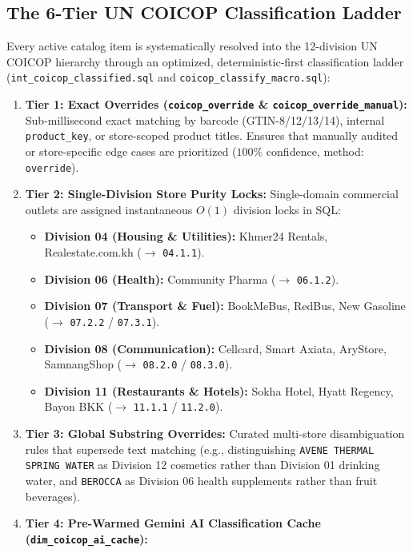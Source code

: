 \documentclass[11pt,a4paper,oneside]{article}
\begin{document}
\subsection{The 6-Tier UN COICOP Classification Ladder}
Every active catalog item is systematically resolved into the 12-division UN COICOP hierarchy through an optimized, deterministic-first classification ladder (\texttt{int\_coicop\_classified.sql} and \texttt{coicop\_classify\_macro.sql}):
\begin{enumerate}
    \item \textbf{Tier 1: Exact Overrides (\texttt{coicop\_override} \& \texttt{coicop\_override\_manual}):}
        Sub-millisecond exact matching by barcode (GTIN-8/12/13/14), internal \texttt{product\_key}, or store-scoped product titles. Ensures that manually audited or store-specific edge cases are prioritized ($100\%$ confidence, method: \texttt{override}).
    \item \textbf{Tier 2: Single-Division Store Purity Locks:}
        Single-domain commercial outlets are assigned instantaneous $O(1)$ division locks in SQL:
        \begin{itemize}[noitemsep]
            \item \textbf{Division 04 (Housing \& Utilities):} Khmer24 Rentals, Realestate.com.kh ($\rightarrow$ \texttt{04.1.1}).
            \item \textbf{Division 06 (Health):} Community Pharma ($\rightarrow$ \texttt{06.1.2}).
            \item \textbf{Division 07 (Transport \& Fuel):} BookMeBus, RedBus, New Gasoline ($\rightarrow$ \texttt{07.2.2} / \texttt{07.3.1}).
            \item \textbf{Division 08 (Communication):} Cellcard, Smart Axiata, AryStore, SamnangShop ($\rightarrow$ \texttt{08.2.0} / \texttt{08.3.0}).
            \item \textbf{Division 11 (Restaurants \& Hotels):} Sokha Hotel, Hyatt Regency, Bayon BKK ($\rightarrow$ \texttt{11.1.1} / \texttt{11.2.0}).
        \end{itemize}
    \item \textbf{Tier 3: Global Substring Overrides:}
        Curated multi-store disambiguation rules that supersede text matching (e.g., distinguishing \texttt{AVENE THERMAL SPRING WATER} as Division 12 cosmetics rather than Division 01 drinking water, and \texttt{BEROCCA} as Division 06 health supplements rather than fruit beverages).
    \item \textbf{Tier 4: Pre-Warmed Gemini AI Classification Cache (\texttt{dim\_coicop\_ai\_cache}):}

\end{enumerate}
\end{document}
